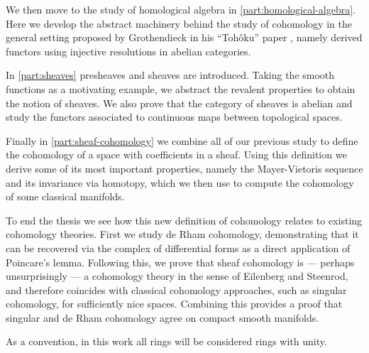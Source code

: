 \documentclass[../../main]{subfiles}
\begin{document}
We then move to the study of homological algebra in \autoref{part:homological-algebra}.
Here we develop the abstract machinery behind the study of cohomology in the general setting proposed by Grothendieck in his ``Tohôku'' paper \cite{grothendieckAspectsHomologicalAlgebraa}, namely derived functors using injective resolutions in abelian categories.

In \autoref{part:sheaves} presheaves and sheaves are introduced.
Taking the smooth functions as a motivating example, we abstract the revalent properties to obtain the notion of sheaves.
We also prove that the category of sheaves is abelian and study the functors associated to continuous maps between topological spaces.

Finally in \autoref{part:sheaf-cohomology} we combine all of our previous study to define the cohomology of a space with coefficients in a sheaf.
Using this definition we derive some of its most important properties, namely the Mayer-Vietoris sequence and its invariance via homotopy, which we then use to compute the cohomology of some classical manifolds.

To end the thesis we see how this new definition of cohomology relates to existing cohomology theories.
First we study de Rham cohomology, demonstrating that it can be recovered via the complex of differential forms as a direct application of Poincare's lemma.
Following this, we prove that sheaf cohomology is --- perhaps unsurprisingly --- a cohomology theory in the sense of Eilenberg and Steenrod, and therefore coincides with classical cohomology approaches, such as singular cohomology, for sufficiently nice spaces.
Combining this provides a proof that singular and de Rham cohomology agree on compact smooth manifolds.

As a convention, in this work all rings will be considered rings with unity.
\end{document}
